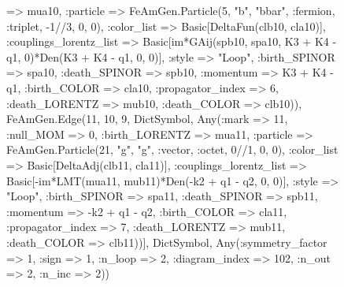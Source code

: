 \documentclass{revtex4}
\begin{document}
\begin{figure}[!htb]
\begin{center}
{=> mua10, :particle => FeAmGen.Particle(5, "b", "bbar", :fermion, :triplet, -1//3, 0, 0), :color_list => Basic[DeltaFun(clb10, cla10)], :couplings_lorentz_list => Basic[im*GAij(spb10, spa10, K3 + K4 - q1, 0)*Den(K3 + K4 - q1, 0, 0)], :style => "Loop", :birth_SPINOR => spa10, :death_SPINOR => spb10, :momentum => K3 + K4 - q1, :birth_COLOR => cla10, :propagator_index => 6, :death_LORENTZ => mub10, :death_COLOR => clb10)), FeAmGen.Edge(11, 10, 9, Dict{Symbol, Any}(:mark => 11, :null_MOM => 0, :birth_LORENTZ => mua11, :particle => FeAmGen.Particle(21, "g", "g", :vector, :octet, 0//1, 0, 0), :color_list => Basic[DeltaAdj(clb11, cla11)], :couplings_lorentz_list => Basic[-im*LMT(mua11, mub11)*Den(-k2 + q1 - q2, 0, 0)], :style => "Loop", :birth_SPINOR => spa11, :death_SPINOR => spb11, :momentum => -k2 + q1 - q2, :birth_COLOR => cla11, :propagator_index => 7, :death_LORENTZ => mub11, :death_COLOR => clb11))], Dict{Symbol, Any}(:symmetry_factor => 1, :sign => 1, :n_loop => 2, :diagram_index => 102, :n_out => 2, :n_inc => 2)) 
}
\end{center}
\end{figure}
\end{document}
